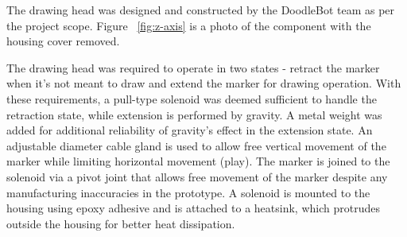 	The drawing head was designed and constructed by the DoodleBot team as per the project scope. Figure ~\ref{fig:z-axis} is a photo of the component with the housing cover removed. 
	
	The drawing head was required to operate in two states - retract the marker when it's not meant to draw and extend the marker for drawing operation. With these requirements, a pull-type solenoid was deemed sufficient to handle the retraction state, while extension is performed by gravity. A metal weight was added for additional reliability of gravity's effect in the extension state. An adjustable diameter cable gland is used to allow free vertical movement of the marker while limiting horizontal movement (play). The marker is joined to the solenoid via a pivot joint that allows free movement of the marker despite any manufacturing inaccuracies in the prototype. A solenoid is mounted to the housing using epoxy adhesive and is attached to a heatsink, which protrudes outside the housing for better heat dissipation. 
